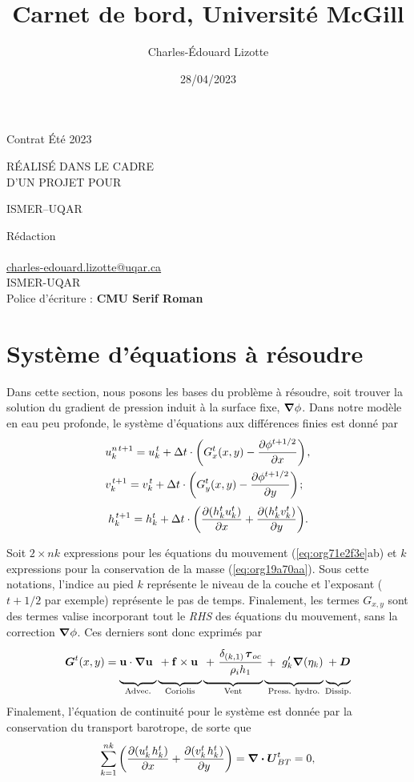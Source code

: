 \documentclass[10pt]{article}
\author{Charles-Édouard Lizotte}
\date{28/04/2023}
\title{Carnet de bord, Université McGill}
\makeatletter
\numberwithin{equation}{section}
\newcommand{\uu}{\vb{u}}
\newcommand{\venti}{\vphantom{\sum_x^x}}
\newcommand{\pt}{\hspace{1pt}} %
\newcommand{\mytitlepage}{
\begin{titlepage}
\begin{center}
{\Huge \thesubtitle \par}
\vspace{2cm}
{\Huge \MakeUppercase{\thetitle} \par}
\vspace{2cm}
RÉALISÉ DANS LE CADRE\\ D'UN PROJET POUR \par
\vspace{2cm}
{\Huge ISMER--UQAR \par}
\vspace{2cm}
{\thedate}
\end{center}
\vfill
Rédaction \\
{\theauthor}\\
\url{charles-edouard.lizotte@uqar.ca}\\
ISMER-UQAR\\
Police d'écriture : \textbf{CMU Serif Roman}
\end{titlepage}
}
\newcommand{\thesubtitle}{Contrat Été 2023}
\makeatother
\begin{document}
\mytitlepage
\tableofcontents\newpage
\section{Système d'équations à résoudre}
\label{sec:org9981196}

Dans cette section, nous posons les bases du problème à résoudre, soit trouver la solution du gradient de pression induit à la surface fixe, \(\gradient \phi\).
Dans notre modèle en eau peu profonde, le système d'équations aux différences finies est donné par
\begin{subequations}
\label{eq:org71e2f3e}
\begin{align}
&u^{n\pt t+1}_k = u^{\pt t}_k + \Delta t \cdot \qty(G^t_x(x,y) - \pdv{\phi^{t+1/2}}{x})\pt,\\
&v^{\pt t+1}_k = v^{\pt t}_k + \Delta t \cdot \qty(G^t_y(x,y) - \pdv{\phi^{t+1/2}}{y})\pt;
\end{align}
\end{subequations}
\begin{equation}
\label{eq:org19a70aa}
h^{\pt t+1}_k = h^t_k + \Delta t \cdot \qty(\pdv{(h^t_k u^t_k)}{x} + \pdv{(h^t_k v^t_k)}{y}).
\end{equation}

Soit \(2 \times nk\) expressions pour les équations du mouvement (\ref{eq:org71e2f3e}ab) et \(k\) expressions pour la conservation de la masse (\ref{eq:org19a70aa}). 
Sous cette notations, l'indice au pied \(k\) représente le niveau de la couche et l'exposant (\(t+1/2\) par exemple) représente le pas de temps.
Finalement, les termes \(G_{x,y}\) sont des termes valise incorporant tout le \emph{RHS} des équations du mouvement, sans la correction \(\gradient \phi\).
Ces derniers sont donc exprimés par
\begin{equation}
\vb*{G}^t(x,y) =
\underbrace{ \venti\uu \cdot \gradient{\uu}\ }_\text{Advec.}
\underbrace{ \venti + \vb{f}\times \uu\ }_\text{Coriolis} 
\underbrace{ \venti+\pt \frac{\delta_{(k,1)}\pt \boldsymbol{\tau}_{oc}}{\rho_i h_1}}_\text{Vent}
\underbrace{ \venti+\ g'_{k} \gradient(\eta_k)}_\text{Press. hydro.}
\underbrace{ \venti+ \vb*{D}}_\text{Dissip.}
\end{equation}
Finalement, l'équation de continuité pour le système est donnée par la conservation du transport barotrope, de sorte que
\begin{equation}
\label{eq:orga960c2a}
\sum_{k=1}^{nk}  \qty(\pdv{(u^t_k\pt h^t_k)}{x} + \pdv{(v^t_k\pt h^t_k)}{y}) = \div{\vb*{U}^t_{BT}} = 0,
\end{equation}
\end{document}
